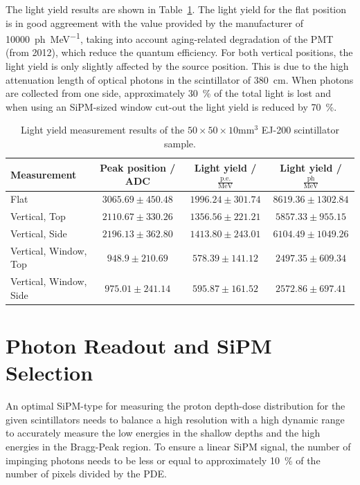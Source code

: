 The light yield results are shown in Table~\ref{tab:lightyield:ej200}.
The light yield for the flat position is in good aggreement with the value provided by the manufacturer of \SI{10000}{ph\per\mega\electronvolt}, taking into account aging-related degradation of the PMT (from 2012), which reduce the quantum efficiency.
For both vertical positions, the light yield is only slightly affected by the source position.
This is due to the high attenuation length of optical photons in the scintillator of \SI{380}{\centi\meter}.
When photons are collected from one side, approximately \SI{30}{\percent} of the total light is lost and when using an \gls{SiPM}-sized window cut-out the light yield is reduced by \SI{70}{\percent}.

\begin{table}[h]
    \centering
    \begin{tabular}{l|c|c|c}
        Measurement & Peak position / ADC & Light yield / $\frac{\text{p.e.}}{\si{\mega\electronvolt}}$ & Light yield / $\frac{\text{ph}}{\si{\mega\electronvolt}}$ \\
        \hline 
        Flat & $3065.69 \pm 450.48$  & $1996.24 \pm 301.74$  & $8619.36 \pm 1302.84$ \\
        Vertical, Top & $2110.67 \pm 330.26$  & $1356.56 \pm 221.21$  & $5857.33 \pm 955.15$ \\
        Vertical, Side & $2196.13 \pm 362.80$  & $1413.80 \pm 243.01$  & $6104.49 \pm 1049.26$ \\
        Vertical, Window, Top & $948.9 \pm 210.69$  & $578.39 \pm 141.12$  & $2497.35 \pm 609.34$ \\
        Vertical, Window, Side & $975.01 \pm 241.14$  & $595.87 \pm 161.52$  & $2572.86 \pm 697.41$ \\
    \end{tabular}
    \caption{Light yield measurement results of the $50 \times 50 \times 10 \si{\milli\meter\cubed}$ EJ-200 scintillator sample.}\label{tab:lightyield:ej200}
\end{table}

\section{Photon Readout and SiPM Selection}\label{section:sipm:selection}
An optimal \gls{SiPM}-type for measuring the proton depth-dose distribution for the given scintillators needs to balance a high resolution with a high dynamic range to accurately measure the low energies in the shallow depths and the high energies in the Bragg-Peak region.
To ensure a linear \gls{SiPM} signal, the number of impinging photons needs to be less or equal to approximately \SI{10}{\percent} of the number of pixels divided by the \gls{PDE}. 


